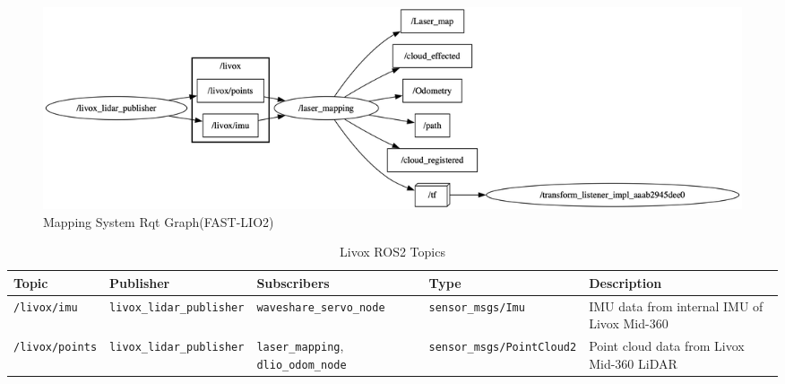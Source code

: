 \documentclass[english, bachelor, utf8]{base/thesis_telematics}
\begin{document}
\begin{figure}[H]
    \centering
    \includegraphics[width=\textwidth]{pics/rqt/ros_fast_lio.png}
    \caption{Mapping System Rqt Graph(FAST-LIO2)}
    \label{fig:ros_fast_lio}
\end{figure}




\begin{table}[ht]
\centering
\caption{Livox ROS2 Topics}
\label{tab:Livox_topics}
\scriptsize  %
\begin{tabularx}{\textwidth}{@{}llXlX@{}}
\toprule
\textbf{Topic} & \textbf{Publisher} & \textbf{Subscribers} & \textbf{Type} & \textbf{Description} \\
\midrule
\texttt{/livox/imu} & \texttt{livox\_lidar\_publisher} & \texttt{waveshare\_servo\_node} & \texttt{sensor\_msgs/Imu} & IMU data from internal IMU of Livox Mid-360 \\[0.3em]
\texttt{/livox/points} & \texttt{livox\_lidar\_publisher} & \texttt{laser\_mapping}, \texttt{dlio\_odom\_node} & \texttt{sensor\_msgs/PointCloud2} & Point cloud data from Livox Mid-360 LiDAR \\
\bottomrule
\end{tabularx}
\end{table}
\end{document}
